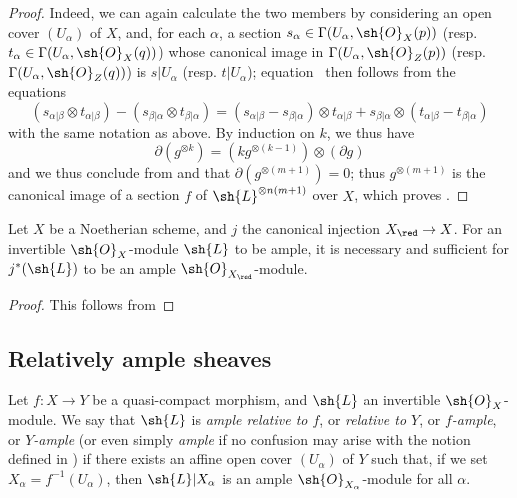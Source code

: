 \begin{proof}
  Indeed, we can again calculate the two members by considering an open cover $(U_\alpha)$ of $X$, and, for each $\alpha$, a section $s_\alpha\in\Gamma(U_\alpha,\sh{O}_X(p))$ (resp. $t_\alpha\in\Gamma(U_\alpha,\sh{O}_X(q))$) whose canonical image in $\Gamma(U_\alpha,\sh{O}_Z(p))$ (resp. $\Gamma(U_\alpha,\sh{O}_Z(q))$) is $s|U_\alpha$ (resp. $t|U_\alpha$);
  equation~ then follows from the equations
  \[
    (s_{\alpha|\beta}\otimes t_{\alpha|\beta}) - (s_{\beta|\alpha}\otimes t_{\beta|\alpha})
    = (s_{\alpha|\beta} - s_{\beta|\alpha})\otimes t_{\alpha|\beta} + s_{\beta|\alpha}\otimes(t_{\alpha|\beta} - t_{\beta|\alpha})
  \]
  with the same notation as above.
  By induction on $k$, we thus have
  \[
  \label{II.4.5.13.4}
    \partial(g^{\otimes k}) = (kg^{\otimes (k-1)})\otimes(\partial g)
  \tag{4.5.13.4}
  \]
  and we thus conclude from  and  that $\partial(g^{\otimes(m+1)})=0$;
  thus $g^{\otimes(m+1)}$ is the canonical image of a section $f$ of $\sh{L}^{\otimes n(m+1)}$ over $X$, which proves .
\end{proof}

\begin{corollary}[4.5.14]
\label{II.4.5.14}
Let $X$ be a Noetherian scheme, and $j$ the canonical injection $X_\red\to X$.
For an invertible $\sh{O}_X$-module $\sh{L}$ to be ample, it is necessary and sufficient for $j^*(\sh{L})$ to be an ample $\sh{O}_{X_\red}$-module.
\end{corollary}

\begin{proof}
This follows from 
\end{proof}


\subsection{Relatively ample sheaves}
\label{subsection:II.4.6}

\begin{definition}[4.6.1]
\label{II.4.6.1}
Let $f: X\to Y$ be a quasi-compact morphism, and $\sh{L}$ an invertible $\sh{O}_X$-module.
We say that $\sh{L}$ is \emph{ample relative to $f$}, or \emph{relative to $Y$}, or \emph{$f$-ample}, or \emph{$Y$-ample} (or even simply \emph{ample} if no confusion may arise with the notion defined in ) if there exists an affine open cover $(U_\alpha)$ of $Y$ such that, if we set $X_\alpha=f^{-1}(U_\alpha)$, then $\sh{L}|X_\alpha$ is an ample $\sh{O}_{X_\alpha}$-module for all $\alpha$.
\end{definition}

